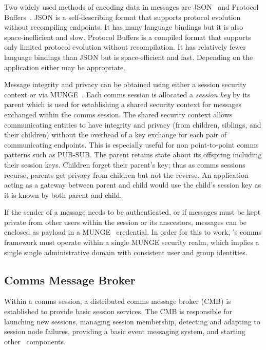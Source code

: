 Two widely used methods of encoding data in messages are
JSON~\cite{rfc4627} 
and Protocol Buffers~\cite{Protobuf}.
JSON is a self-describing format
that supports protocol evolution without recompiling endpoints.  It has
many language bindings but it is also space-inefficient and slow.
Protocol Buffers is a compiled format that supports
only limited protocol evolution without recompilation.  It has relatively
fewer language bindings than JSON but is space-efficient and fast.
Depending on the application either may be appropriate.

Message integrity and privacy can be obtained using either a session
security context or via MUNGE~\cite{MUNGE}.
Each comms session is allocated a {\em session key} by its parent
which is used for establishing a shared security context
for messages exchanged within the comms session.
The shared security context allows communicating entities to have integrity
and privacy (from children, siblings, and their children)
without the overhead
of a key exchange for each pair of communicating endpoints.
This is especially useful for non point-to-point comms patterns such as PUB-SUB.
The parent retains state about its offspring including their session keys.
Children forget their parent's key;  thus as comms sessions recurse,
parents get privacy from children but not the reverse.
An application acting as a gateway between parent and child would use
the child's session key as it is known by both parent and child.

If the sender of a message needs to be authenticated, or if messages must
be kept private from other users within the session or its anscestors,
messages can be enclosed as payload in a MUNGE~\cite{MUNGE}
credential.
In order for this to work, \ngrm's comms framework must operate within a
single MUNGE security realm,
which implies a single single administrative domain with consistent
user and group identities.

\subsection{Comms Message Broker}\label{SecCommsCMB}

Within a comms session, a distributed comms message broker (CMB)
is established to provide basic session services.
The CMB is responsible for launching new sessions,
managing session membership,
detecting and adapting to session node failures,
providing a basic event messaging system,
and starting other \ngrm\ components.


